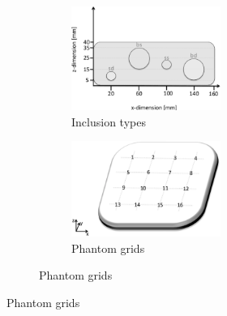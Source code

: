 {\begin{figure}[]
\begin{subfigure}[b]{0.53\textwidth}
		\begin{subfigure}[b]{\textwidth}
			\centering
			\begin{subfigure}[b]{0.51\textwidth}
				\includegraphics[width=\textwidth]{./figs/phside.eps}
				\caption{Inclusion types}
				\label{phantomgrid:description}
			\end{subfigure}
			\begin{subfigure}[b]{0.46\textwidth}
				\includegraphics[width=\textwidth]{./figs/phlocations.eps}
				\caption{Phantom grids}
				\label{phantomgrid:3d}
			\end{subfigure} 
		\end{subfigure}
	\end{subfigure}
	\caption{}
	\label{robot-set-up}
	

\end{figure}}
